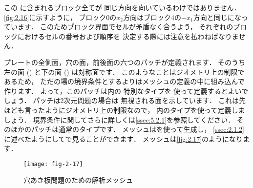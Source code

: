 この
%
%
に含まれるブロック全てが
同じ方向を向いているわけではありません．
\autoref{fig:2.16}に示すように，
ブロック0の$x_{2}$方向はブロック4の$-x_{1}$方向と同じになっています．
このためブロック界面でセルが矛盾なく合うよう，
それぞれのブロックにおけるセルの番号および順序を
決定する際には注意を払わねばなりません．

プレートの全側面，穴の面，前後面の六つのパッチが定義されます．
そのうち左の面 () と下の面 () は対称面です．
このようなことはジオメトリ上の制限であるため，
ただの場の境界条件とするよりはメッシュの定義の中に組み込んで作ります．
よって，このパッチは内の
特別なタイプを
使って定義するとよいでしょう．
パッチは2次元問題の場合は
無視される面を示しています．
これは先ほども言ったようにジオメトリ上の制限なので，
内のタイプを使って定義しましょう．
境界条件に関してさらに詳しくは\autoref{ssec:5.2.1}を参照してください．
そのほかのパッチは通常のタイプです．
メッシュはを使って生成し，
\autoref{ssec:2.1.2}に述べたようにしてで見ることができます．
メッシュは\autoref{fig:2.17}のようになります．


\begin{figure}[ht]
 \texttt{[image: fig-2-17]}
 \caption{穴あき板問題のための解析メッシュ}
 \label{fig:2.17}
\end{figure}


